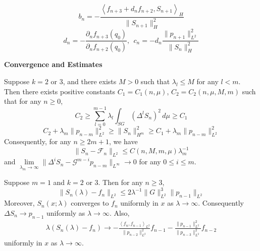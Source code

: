 \documentclass[a0, landscape]{a0poster}
\newcommand{\inner}[2]{\left \langle #1, #2\right \rangle}
\begin{document}
{\begin{textblock*}{25in}
\begin{minipage}{21in}
\begin{multicols}{2}
\begin{theorem*}
        $$b_n= -\frac{\inner{f_{n+3}+d_nf_{n+2}}{S_{n+1}}_H}{\|S_{n+1}\|_H^2}$$
        $$ d_n=-\frac{\partial_n f_{n+3}(q_0)}{\partial_nf_{n+2}(q_0)},\:\:c_n=-d_n\frac{\|p_{n+1}\|_{L^2}^2}{\|S_n\|_H^2}\label{d_n and c_n in k=1 recurrence}$$
    \end{theorem*}
    \vfill\null
    \columnbreak
    \begin{center}
        {\Large \textcolor{CornellRed}{\textbf{Convergence and Estimates}}}
    \end{center}
    \begin{corollary} 
    Suppose $k=2$ or $3$, and there exists $M>0$ such that $\lambda_l\le M$ for any $l<m$. Then there exists positive constants $C_1=C_1(n,\mu)$, $C_2=C_2(n,\mu,M,m)$ such that for any $n\ge 0$, $$C_2 \ge\sum\limits_{l = 0}^{m-1} \lambda_l\int_{SG}(\Delta ^l S_n)^2\,d\mu\ge C_1$$ $$
      C_2+\lambda_m\|p_{n-m}\|_{L^2}^2\ge \|S_n\|_{H^m}^2\ge C_1+
      \lambda_m \|p_{n-m}\|_{L^2}^2$$
      Consequently, for any $n\ge 2m+1$, we have$$\|S_n-\mathcal{F}_n\|_{L^2}\le
      C(n,M,m,\mu)\lambda_m^{-1}$$and
      $\lim\limits_{\lambda_m\rightarrow\infty}\|\Delta^i S_n-\mathcal{G}^{m-i}p_{n-m}\|_{L^\infty}\rightarrow 0$ for any $0\le i\le m$.
    \end{corollary}
    \begin{corollary}
      Suppose $m=1$ and $k=2$ or $3$. Then for any $n\ge3$, $$\|S_n(\lambda)-f_n\|_{L^2}\le 2\lambda^{-1}\|G\|_{L^2}^3\|p_{n-1}\|_{L^2}$$ Moreover, $S_n(x;\lambda)$ converges to $f_n$ uniformly in $x$ as $\lambda\rightarrow\infty$. Consequently $\Delta S_n\rightarrow p_{n-1}$ uniformly as $\lambda\rightarrow\infty$. Also, 
    \begin{align*}
    \lambda(S_n(\lambda)-f_n)\rightarrow-\frac{\inner{f_n}{f_{n-1}}_{L^2}}{\|p_{n-2}\|_{L^2}^2}f_{n-1}-\frac{\|p_{n-1}\|_{L^2}^2}{\|p_{n-3}\|_{L^2}^2}f_{n-2}
    \end{align*}
    uniformly in $x$ as $\lambda\rightarrow\infty$.
    \end{corollary}
    \end{multicols}
    \end{minipage}
  \end{textblock*}%
}
\end{document}
